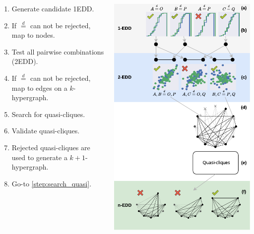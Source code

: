 \documentclass[10pt]{beamer}
\newcommand{\eqdist}{\stackrel{d}{=}}
\begin{document}
\begin{frame}{}
    \begin{columns}
    \begin{column}{0.5\linewidth}
        \renewcommand{\theenumi}{\alph{enumi}}
        \begin{enumerate}
            \item Generate candidate 1EDD.
            \item If $\eqdist$ can not be rejected, map to nodes.
            \item Test all pairwise combinations (2EDD).
            \item If $\eqdist$ can not be rejected, map to edges on a $k$-hypergraph.
            \item Search for quasi-cliques\label{step:search_quasi}.
            \item Validate quasi-cliques.
            \item Rejected quasi-cliques are used to generate a $k+1$-hypergraph.
            \item Go-to \ref{step:search_quasi}.
        \end{enumerate}
    \end{column}
    \begin{column}{.5\linewidth}
        \includegraphics[width=0.9\linewidth]{pipeline}
    \end{column}
    \end{columns}
\end{frame}
\end{document}
